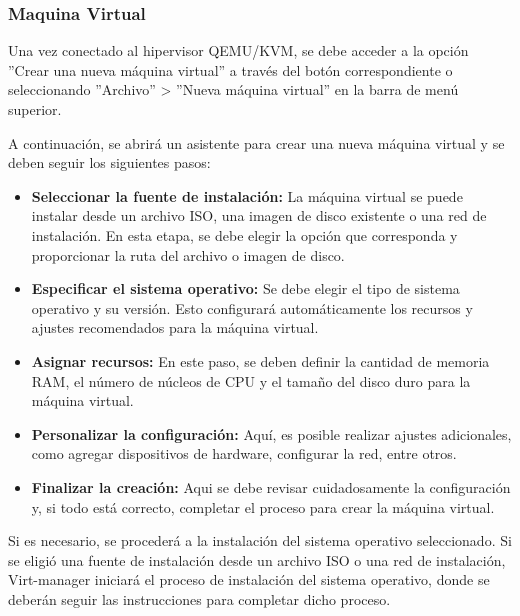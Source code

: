 			\subsubsection{Maquina Virtual}
			
			Una vez conectado al hipervisor QEMU/KVM, se debe acceder a la opción ''Crear una nueva máquina virtual'' a través del botón correspondiente o seleccionando ''Archivo'' > ''Nueva máquina virtual'' en la barra de menú superior.
			
			A continuación, se abrirá un asistente para crear una nueva máquina virtual y se deben seguir los siguientes pasos:

			\begin{itemize}
				
				\item \textbf{Seleccionar la fuente de instalación:} La máquina virtual se puede instalar desde un archivo ISO, una imagen de disco existente o una red de instalación. En esta etapa, se debe elegir la opción que corresponda y proporcionar la ruta del archivo o imagen de disco.
				
				\item \textbf{Especificar el sistema operativo:} Se debe elegir el tipo de sistema operativo y su versión. Esto configurará automáticamente los recursos y ajustes recomendados para la máquina virtual.
				
				\item \textbf{Asignar recursos:} En este paso, se deben definir la cantidad de memoria RAM, el número de núcleos de CPU y el tamaño del disco duro para la máquina virtual.
				
				\item \textbf{Personalizar la configuración:} Aquí, es posible realizar ajustes adicionales, como agregar dispositivos de hardware, configurar la red, entre otros.
				
				\item \textbf{Finalizar la creación:} Aqui se debe revisar cuidadosamente la configuración y, si todo está correcto, completar el proceso para crear la máquina virtual.
				
			\end{itemize}
			
			Si es necesario, se procederá a la instalación del sistema operativo seleccionado. Si se eligió una fuente de instalación desde un archivo ISO o una red de instalación, Virt-manager iniciará el proceso de instalación del sistema operativo, donde se deberán seguir las instrucciones para completar dicho proceso.
			
